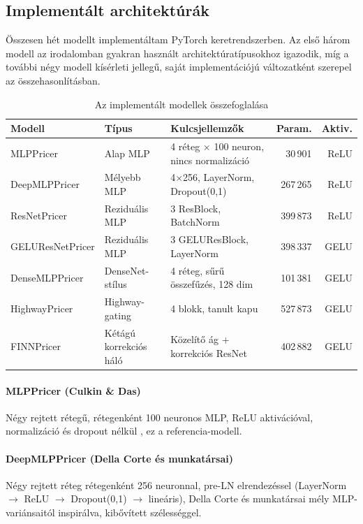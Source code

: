 \subsection{Implementált architektúrák}

Összesen hét modellt implementáltam PyTorch keretrendszerben. Az első három modell az irodalomban gyakran használt architektúratípusokhoz igazodik, míg a további négy modell kísérleti jellegű, saját implementációjú változatként szerepel az összehasonlításban.

\begin{table}[H]
\centering
\caption{Az implementált modellek összefoglalása}
\label{tab:architectures}
\small
\begin{tabular}{p{3.5cm}p{3cm}p{4.8cm}rr}
\toprule
Modell & Típus & Kulcsjellemzők & Param. & Aktiv. \\
\midrule
MLPPricer      & Alap MLP         & 4 réteg $\times$ 100 neuron, nincs normalizáció     &  30\,901 & ReLU \\
DeepMLPPricer  & Mélyebb MLP      & 4$\times$256, LayerNorm, Dropout(0{,}1)       & 267\,265 & ReLU \\
ResNetPricer   & Reziduális MLP   & 3 ResBlock, BatchNorm                         & 399\,873 & ReLU \\
GELUResNetPricer & Reziduális MLP & 3 GELUResBlock, LayerNorm                     & 398\,337 & GELU \\
DenseMLPPricer & DenseNet-stílus  & 4 réteg, sűrű összefűzés, 128 dim             & 101\,381 & GELU \\
HighwayPricer  & Highway-gating   & 4 blokk, tanult kapu                          & 527\,873 & GELU \\
FINNPricer     & Kétágú korrekciós háló     & Közelítő ág + korrekciós ResNet               & 402\,882 & GELU \\
\bottomrule
\end{tabular}
\end{table}

\paragraph{MLPPricer (Culkin \& Das)}
Négy rejtett rétegű, rétegenként 100 neuronos MLP, ReLU aktivációval,
normalizáció és dropout nélkül \cite{culkin2017}, ez a referencia-modell.

\paragraph{DeepMLPPricer (Della Corte és munkatársai)}
Négy rejtett réteg rétegenként 256 neuronnal, pre-LN elrendezéssel
(LayerNorm $\to$ ReLU $\to$ Dropout(0{,}1) $\to$ lineáris), Della Corte és munkatársai \cite{dellacorte2023} mély MLP-variánsaitól inspirálva, kibővített szélességgel.

